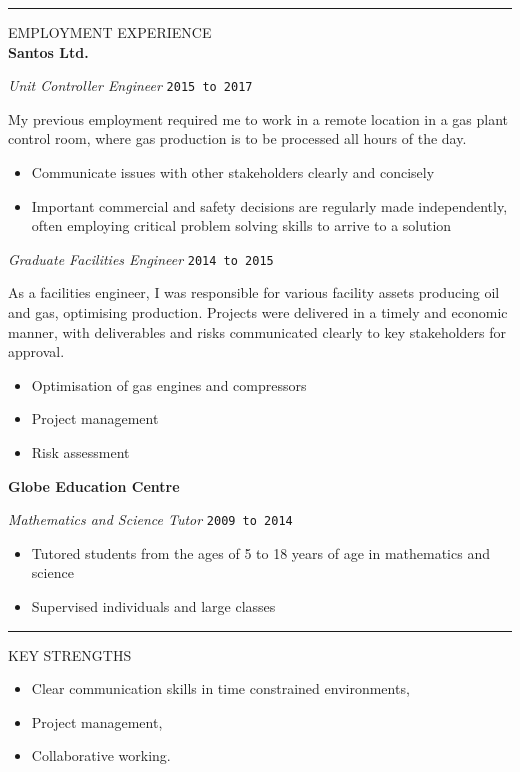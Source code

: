 \documentclass{article}
\newcommand{\HRule}{\rule{\linewidth}{0.5mm}}
\begin{document}
\HRule

{\footnotesize EMPLOYMENT EXPERIENCE}
\\

\textbf{\large Santos Ltd.}

\emph{Unit Controller Engineer} \hfill \texttt{2015 to 2017}

{\footnotesize
My previous employment required me to work in a remote location in a gas plant control room, where gas production is to be processed all hours of the day.

\begin{itemize}
\item Communicate issues with other stakeholders clearly and concisely
\item Important commercial and safety decisions are regularly made independently, often employing critical problem solving skills to arrive to a solution
\end{itemize}
}
\emph{Graduate Facilities Engineer} \hfill \texttt{2014 to 2015}

{\footnotesize
As a facilities engineer, I was responsible for various facility assets producing oil and gas, optimising production. Projects were delivered in a timely and economic manner, with deliverables and risks communicated clearly to key stakeholders for approval.

\begin{itemize}
\item Optimisation of gas engines and compressors
\item Project management
\item Risk assessment \\
\end{itemize} }


\textbf{Globe Education Centre}

\emph{Mathematics and Science Tutor} \hfill \texttt{2009 to 2014}
{\footnotesize
\begin{itemize}
\item Tutored students from the ages of 5 to 18 years of age in mathematics and science
\item Supervised individuals and large classes
\end{itemize} }
\HRule


{\footnotesize KEY STRENGTHS}

\begin{itemize}
\item Clear communication skills in time constrained environments,
\item Project management,
\item Collaborative working.
\end{itemize}
\end{document}

